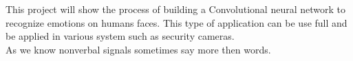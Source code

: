     This project will show the process of building a Convolutional  neural network to recognize emotions on humans faces.
    This type of application can be use full and be applied  in various system such as security cameras. \\ 
    As we know nonverbal signals sometimes say more then words.